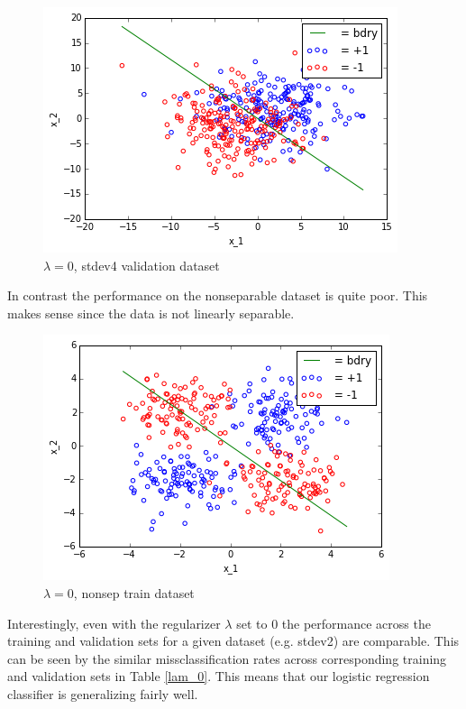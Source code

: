 \documentclass[10pt]{article}
\begin{document}
\begin{figure}
 \centering
 \includegraphics[scale=0.5]{stdev4_val_lam_0.png}
 
 \caption{$\lambda = 0$, stdev4 validation dataset}
 \label{stdev4_val_lam_0}
 \end{figure}
 In contrast the performance on the nonseparable dataset is quite poor. This makes sense since the data is not linearly separable.
\begin{figure}[H]
 \centering
 \includegraphics[scale=0.5]{nonsep_train_lam_0.png}
 
 \caption{$\lambda = 0$, nonsep train dataset}
 \label{nonsep_train_lam_0}
 \end{figure}

 Interestingly, even with the regularizer $\lambda$ set to $0$ the performance across the training and validation sets for a given dataset (e.g. stdev2) are comparable. This can be seen by the similar missclassification rates across corresponding training and validation sets in Table \ref{lam_0}. This means that our logistic regression classifier is generalizing fairly well.
\end{document}
